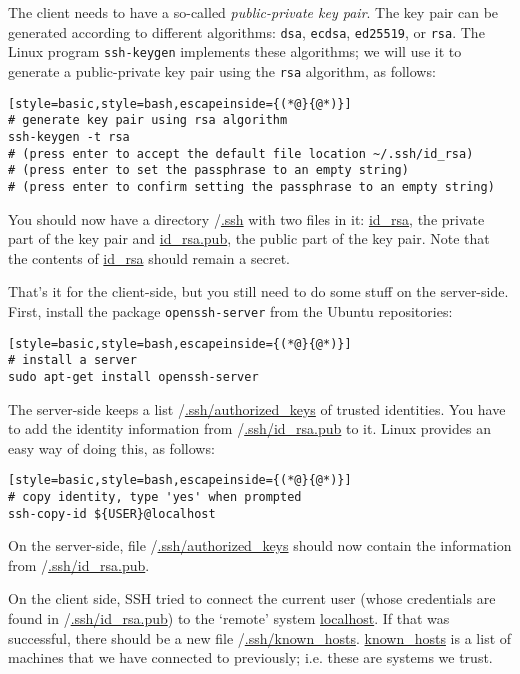 The client needs to have a so-called \textit{public-private key pair}. The key pair can be generated according to different algorithms:
\texttt{dsa},
\texttt{ecdsa},
\texttt{ed25519}, or
\texttt{rsa}.
The Linux program \texttt{ssh-keygen} implements these algorithms; we will use it to generate a public-private key pair using the \texttt{rsa} algorithm, as follows:

\begin{lstlisting}[style=basic,style=bash,escapeinside={(*@}{@*)}]
# generate key pair using rsa algorithm
ssh-keygen -t rsa
# (press enter to accept the default file location ~/.ssh/id_rsa)
# (press enter to set the passphrase to an empty string)
# (press enter to confirm setting the passphrase to an empty string)
\end{lstlisting}

You should now have a directory \mytilde/\url{.ssh} with two files in it: \url{id_rsa},  the private part of the key pair and \url{id_rsa.pub}, the public part of the key pair. Note that the contents of \url{id_rsa} should remain a secret.

That's it for the client-side, but you still need to do some stuff on the server-side. First, install the package \texttt{openssh-server} from the Ubuntu repositories:
\begin{lstlisting}[style=basic,style=bash,escapeinside={(*@}{@*)}]
# install a server
sudo apt-get install openssh-server
\end{lstlisting} %

The server-side keeps a list \mytilde/\url{.ssh/authorized_keys} of trusted identities. You have to add the identity information from \mytilde/\url{.ssh/id_rsa.pub} to it. Linux provides an easy way of doing this, as follows:
\begin{lstlisting}[style=basic,style=bash,escapeinside={(*@}{@*)}]
# copy identity, type 'yes' when prompted
ssh-copy-id ${USER}@localhost
\end{lstlisting} %

On the server-side, file \mytilde/\url{.ssh/authorized_keys} should now contain the information from \mytilde/\mbox{\url{.ssh/id_rsa.pub}}.

On the client side, SSH tried to connect the current user (whose credentials are found in \mytilde/\url{.ssh/id_rsa.pub}) to the `remote' system \url{localhost}. If that was successful, there should be a new file \mytilde/\url{.ssh/known_hosts}. \url{known_hosts} is a list of machines that we have connected to previously; i.e. these are systems we trust.

